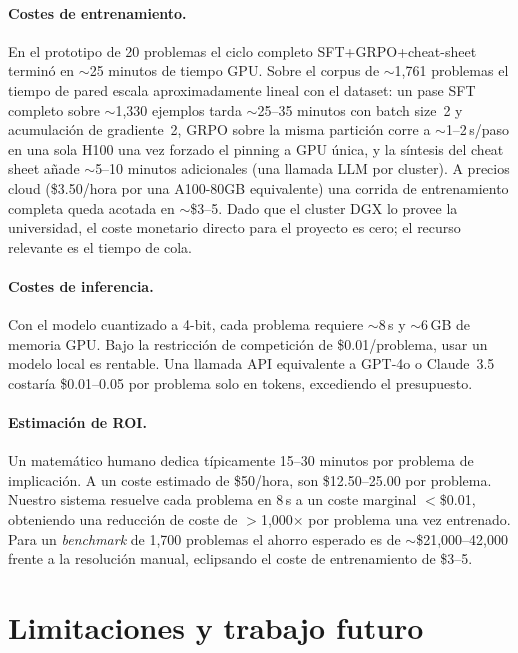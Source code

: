 \documentclass{article}
\begin{document}
\paragraph{Costes de entrenamiento.} En el prototipo de 20 problemas el ciclo completo SFT+GRPO+cheat-sheet termin\'o en $\sim$25 minutos de tiempo GPU. Sobre el corpus de $\sim$1{,}761 problemas el tiempo de pared escala aproximadamente lineal con el dataset: un pase SFT completo sobre $\sim$1{,}330 ejemplos tarda $\sim$25--35 minutos con batch size~2 y acumulaci\'on de gradiente~2, GRPO sobre la misma partici\'on corre a $\sim$1--2\,s/paso en una sola H100 una vez forzado el pinning a GPU \'unica, y la s\'intesis del cheat sheet a\~nade $\sim$5--10 minutos adicionales (una llamada LLM por cluster). A precios cloud (\$3.50/hora por una A100-80GB equivalente) una corrida de entrenamiento completa queda acotada en $\sim$\$3--5. Dado que el cluster DGX lo provee la universidad, el coste monetario directo para el proyecto es cero; el recurso relevante es el tiempo de cola.

\paragraph{Costes de inferencia.} Con el modelo cuantizado a 4-bit, cada problema requiere $\sim$8\,s y $\sim$6\,GB de memoria GPU. Bajo la restricci\'on de competici\'on de \$0.01/problema, usar un modelo local es rentable. Una llamada API equivalente a GPT-4o o Claude~3.5 costar\'ia \$0.01--0.05 por problema solo en tokens, excediendo el presupuesto.

\paragraph{Estimaci\'on de ROI.} Un matem\'atico humano dedica t\'ipicamente 15--30 minutos por problema de implicaci\'on. A un coste estimado de \$50/hora, son \$12.50--25.00 por problema. Nuestro sistema resuelve cada problema en 8\,s a un coste marginal $<$\$0.01, obteniendo una reducci\'on de coste de $>$1{,}000$\times$ por problema una vez entrenado. Para un \textit{benchmark} de 1{,}700 problemas el ahorro esperado es de $\sim$\$21{,}000--42{,}000 frente a la resoluci\'on manual, eclipsando el coste de entrenamiento de \$3--5.

\section{Limitaciones y trabajo futuro}
\label{sec:limitations}
\end{document}
